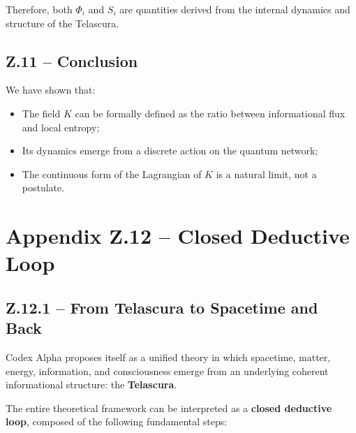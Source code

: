 \documentclass[12pt]{article}
\begin{document}
Therefore, both \( \Phi_i \) and \( S_i \) are quantities derived from the internal dynamics and structure of the Telascura.

\subsection*{Z.11 – Conclusion}

We have shown that:
\begin{itemize}
  \item The field \( K \) can be formally defined as the ratio between informational flux and local entropy;
  \item Its dynamics emerge from a discrete action on the quantum network;
  \item The continuous form of the Lagrangian of \( K \) is a natural limit, not a postulate.
\end{itemize}

\section*{Appendix Z.12 – Closed Deductive Loop}

\subsection*{Z.12.1 – From Telascura to Spacetime and Back}

Codex Alpha proposes itself as a unified theory in which spacetime, matter, energy, information, and consciousness emerge from an underlying coherent informational structure: the \textbf{Telascura}.

The entire theoretical framework can be interpreted as a \textbf{closed deductive loop}, composed of the following fundamental steps:
\end{document}

